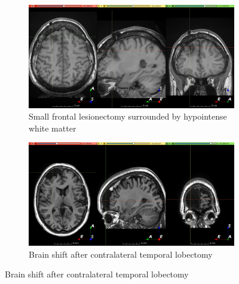 \begin{figure}

  \begin{subfigure}{0.49\textwidth}
    \centering
    \includegraphics[width=\linewidth]{figures/hard_0}
    \caption{Small frontal lesionectomy surrounded by hypointense white matter}
    \label{fig:hard_sub_0}
  \end{subfigure}
  \hfill
  \begin{subfigure}{0.49\textwidth}
    \centering
    \includegraphics[width=\linewidth]{figures/hard_1}
    \caption{Brain shift after contralateral temporal lobectomy}
    \label{fig:hard_sub_1}
  \end{subfigure}

  \bigskip


\end{figure}
